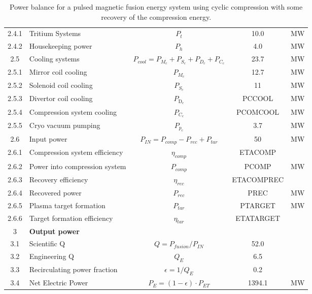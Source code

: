 \begin{table}[ht!]
\begin{tabular}{|c|p{5cm}|c|c|c|}
2.4.1	&	Tritium Systems	&	$P_{{t}}$	&	10.0	&	MW \\
2.4.2	&	Housekeeping power	&	$P_{{h}}$	&	4.0	&	MW \\
2.5	&	Cooling systems	&	$P_{cool} = P_{{M}_c} + P_{{S}_c} + P_{{D}_c}+ P_{{C}_c}$	&	23.7	&	MW \\
2.5.1	&	Mirror coil cooling	&	$P_{{M}_c}$	&	12.7	&	MW \\
2.5.2	&	Solenoid coil cooling	&	$P_{{S}_c}$	&	11	&	MW \\
2.5.3 & Divertor coil cooling & $P_{\text{D}_c}$ & PCCOOL & MW \\
2.5.4	&	Compression system cooling	&	$P_{{C}_c}$	&	PCOMCOOL	&	MW \\
2.5.5	&	Cryo vacuum pumping	&	$P_{{p}_c}$	&	3.7	&	MW \\
2.6	& Input power	& $P_{IN} = P_{comp}-P_{{rec}} + P_{tar}$	&	50	&	MW \\
2.6.1	&	Compression system efficiency	&	$\eta_{{comp}}$	&	ETACOMP	&	\\
2.6.2	&	Power into compression system	&	$P_{{comp}}$	&	PCOMP	&	MW \\
2.6.3	&	Recovery efficiency	&	$\eta_{{rec}}$	&	ETACOMPREC	&	 \\
2.6.4	&	Recovered power	&	$P_{{rec}}$	&	PREC	&	MW \\
2.6.5	&	Plasma target formation	&	$P_{{tar}}$	&	PTARGET	&	MW \\
2.6.6	&	Target formation efficiency	&	$\eta_{tar}$	&	ETATARGET	&	 \\

\hline								
3	&	\textbf{Output power}	&		&		&	\\
\hline
3.1	&	Scientific Q	&	$Q = P_{{fusion}}/P_{{IN}}$	&	52.0	&	\\
3.2	&	Engineering Q	&	$Q_{{E}}$	&	6.5	&	\\
3.3	&	Recirculating power fraction	&	$\epsilon = 1/Q_{{E}}$	&	0.2	&	\\
3.4	&	Net Electric Power	&	$P_{{E}} = (1 - \epsilon) \cdot P_{{ET}}$	&	1394.1	&	MW \\
\hline								
\end{tabular}	
\caption{Power balance for a pulsed magnetic fusion energy system using cyclic compression with some recovery of the compression energy.}
\label{tab:powerbalance}
\end{table}



